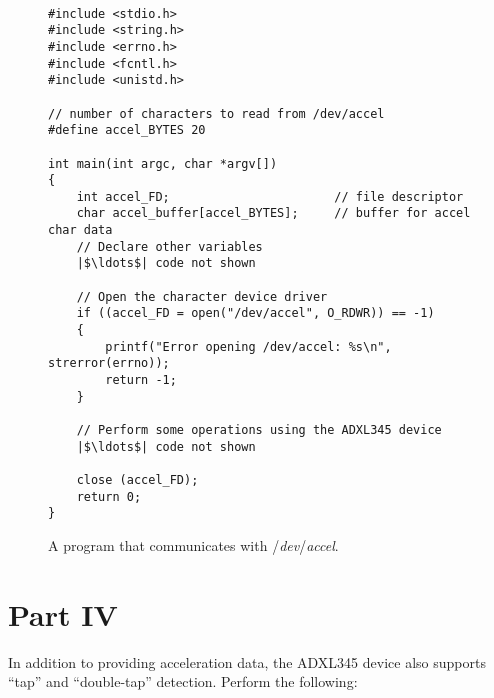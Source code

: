 \documentclass[epsfig,10pt,fullpage]{article}
\begin{document}
~\\
\lstset{language=C,numbers=none,escapechar=|}
\begin{figure}[h]
\begin{center}
\begin{minipage}[t]{13.5 cm}
\begin{lstlisting}[name=part1]
#include <stdio.h>
#include <string.h>
#include <errno.h>
#include <fcntl.h>
#include <unistd.h>

// number of characters to read from /dev/accel
#define accel_BYTES 20

int main(int argc, char *argv[])
{
	int accel_FD;						// file descriptor
	char accel_buffer[accel_BYTES];		// buffer for accel char data
	// Declare other variables
	|$\ldots$| code not shown 
    
	// Open the character device driver
  	if ((accel_FD = open("/dev/accel", O_RDWR)) == -1)
	{
		printf("Error opening /dev/accel: %s\n", strerror(errno));
		return -1;
	}
	
	// Perform some operations using the ADXL345 device
	|$\ldots$| code not shown

	close (accel_FD);
	return 0;
}
\end{lstlisting}
\end{minipage}
\caption{A program that communicates with /{\it dev}/{\it accel}.}
\label{fig:part2}
\end{center}
\end{figure}
\newpage
\noindent
\section*{Part IV}

\noindent
In addition to providing acceleration data, the ADXL345 device also supports ``tap'' and
``double-tap'' detection. Perform the following:
\end{document}

